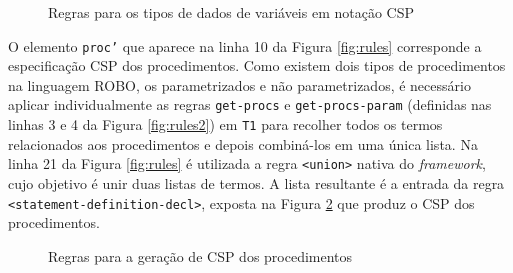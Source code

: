\begin{figure}[!h]
\centering
\caption{Regras para os tipos de dados de variáveis em notação CSP}

\label{fig:rules_var_init}
\end{figure}

O elemento \texttt{proc'} que aparece na linha 10 da Figura \ref{fig:rules} corresponde a especificação CSP dos procedimentos.  
Como existem dois tipos de procedimentos na linguagem ROBO, os parametrizados e não parametrizados, é necessário aplicar individualmente as regras \texttt{get-procs} e \texttt{get-procs-param} (definidas nas linhas 3 e 4 da Figura \ref{fig:rules2}) em \texttt{T1} para recolher todos os termos relacionados aos procedimentos e depois combiná-los em uma única lista.
Na linha 21 da Figura \ref{fig:rules} é utilizada a regra \texttt{<union>}  nativa do \textit{framework}, cujo objetivo é unir duas listas de termos.  A lista resultante é a entrada da regra \texttt{<statement-definition-decl>}, exposta na Figura \ref{fig:rules_proc} que produz o CSP dos procedimentos.

\begin{figure}[!h]
\centering
\caption{Regras para a geração de CSP dos procedimentos}

\label{fig:rules_proc}
\end{figure}

